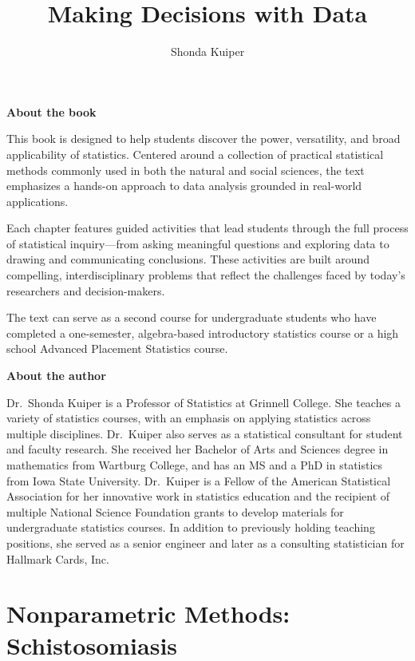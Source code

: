 \documentclass[
]{book}
\title{Making Decisions with Data}
\author{Shonda Kuiper}
\date{}
\begin{document}
\maketitle

{
\setcounter{tocdepth}{1}
\tableofcontents
}
\newpage

\textbf{About the book}

This book is designed to help students discover the power, versatility, and broad applicability of statistics. Centered around a collection of practical statistical methods commonly used in both the natural and social sciences, the text emphasizes a hands-on approach to data analysis grounded in real-world applications.

Each chapter features guided activities that lead students through the full process of statistical inquiry---from asking meaningful questions and exploring data to drawing and communicating conclusions. These activities are built around compelling, interdisciplinary problems that reflect the challenges faced by today's researchers and decision-makers.

The text can serve as a second course for undergraduate students who have completed a one-semester, algebra-based introductory statistics course or a high school Advanced Placement Statistics course.

\textbf{About the author}

Dr.~Shonda Kuiper is a Professor of Statistics at Grinnell College. She teaches a variety of statistics courses, with an emphasis on applying statistics across multiple disciplines. Dr.~Kuiper also serves as a statistical consultant for student and faculty research. She received her Bachelor of Arts and Sciences degree in mathematics from Wartburg College, and has an MS and a PhD in statistics from Iowa State University. Dr.~Kuiper is a Fellow of the American Statistical Association for her innovative work in statistics education and the recipient of multiple National Science Foundation grants to develop materials for undergraduate statistics courses. In addition to previously holding teaching positions, she served as a senior engineer and later as a consulting statistician for Hallmark Cards, Inc.

\newpage

\hypertarget{nonparametric-methods-schistosomiasis}{%
\chapter{Nonparametric Methods: Schistosomiasis}\label{nonparametric-methods-schistosomiasis}}
\end{document}
